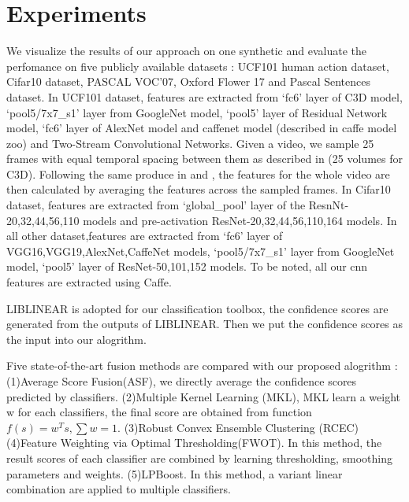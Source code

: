 \documentclass[letterpaper]{article}
\begin{document}
\section{Experiments}
We visualize the results of our approach on one synthetic and evaluate the perfomance on five publicly available datasets : UCF101 human action dataset\cite{soomro2012ucf101}, Cifar10\cite{krizhevsky2009learning} dataset, PASCAL VOC’07\cite{pascal-voc-2007}, Oxford Flower 17\cite{nilsback2006visual} and Pascal Sentences dataset.
In UCF101 dataset, features are extracted from `fc6' layer of C3D model\cite{tran2015learning}, `pool5/7x7\_s1' layer from GoogleNet model\cite{szegedy2015going}, `pool5' layer of Residual Network model\cite{he2015deep}, `fc6' layer of AlexNet\cite{krizhevsky2012imagenet} model\cite{alex} and caffenet model (described in caffe model zoo) and Two-Stream Convolutional Networks. Given a video, we sample 25 frames with equal temporal spacing between them as described in \cite{twostream}(25 volumes for C3D). Following the same produce in \cite{tran2015learning} and \cite{simonyan2014two}, the features for the whole video are then calculated by averaging the features across the sampled frames.
In Cifar10 dataset, features are extracted from `global\_pool' layer of the ResnNt-20,32,44,56,110 models\cite{he2015deep} and pre-activation ResNet-20,32,44,56,110,164 models\cite{he2016identity}.
In all other dataset,features are extracted from `fc6' layer of VGG16,VGG19\cite{chatfield2014return},AlexNet,CaffeNet models, `pool5/7x7\_s1' layer from GoogleNet model\cite{szegedy2015going}, `pool5' layer of ResNet-50,101,152 models.
To be noted, all our cnn features are extracted using Caffe\cite{jia2014caffe}.

LIBLINEAR\cite{fan2008liblinear} is adopted for our classification toolbox, the confidence scores are generated from the outputs of LIBLINEAR. Then we put the confidence scores as the input into our alogrithm.

Five state-of-the-art fusion methods are compared with our proposed alogrithm : (1)Average Score Fusion(ASF), we directly average the confidence scores predicted by classifiers. (2)Multiple Kernel Learning (MKL),  MKL learn a weight w for each classifiers, the final score are obtained from function $f(s)=w^{T}s, \sum w = 1$. (3)Robust Convex Ensemble Clustering (RCEC)\cite{gaoijcai2016robust} (4)Feature Weighting via Optimal Thresholding(FWOT)\cite{xuiccv2013feature}. In this method, the result scores of each classifier are combined by learning thresholding, smoothing parameters and weights. (5)LPBoost\cite{gehler2009feature}. In this method, a variant linear combination are applied to multiple classifiers.
\end{document}
